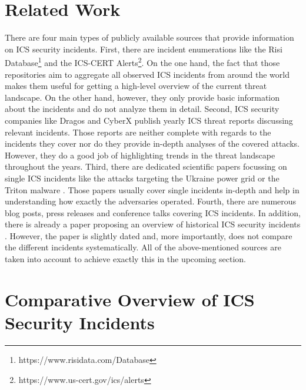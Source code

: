 \documentclass[runningheads]{llncs}
\begin{document}
\section{Related Work}
There are four main types of publicly available sources that provide information on ICS security incidents.
First, there are incident enumerations like the Risi Database\footnote{https://www.risidata.com/Database} and the ICS-CERT Alerts\footnote{https://www.us-cert.gov/ics/alerts}.
On the one hand, the fact that those repositories aim to aggregate all observed ICS incidents from around the world makes them useful for getting a high-level overview of the current threat landscape.
On the other hand, however, they only provide basic information about the incidents and do not analyze them in detail.
Second, ICS security companies like Dragos \cite{dragos.19} and CyberX \cite{cyberx.19} publish yearly ICS threat reports discussing relevant incidents.
Those reports are neither complete with regards to the incidents they cover nor do they provide in-depth analyses of the covered attacks.
However, they do a good job of highlighting trends in the threat landscape throughout the years.
Third, there are dedicated scientific papers focussing on single ICS incidents like the attacks targeting the Ukraine power grid \cite{eisac.16} or the Triton malware \cite{pinto.18}. Those papers usually cover single incidents in-depth and help in understanding how exactly the adversaries operated.
Fourth, there are numerous blog posts, press releases and conference talks covering ICS incidents.
In addition, there is already a paper proposing an overview of historical ICS security incidents \cite{hemsley.18}.
However, the paper is slightly dated and, more importantly, does not compare the different incidents systematically.
All of the above-mentioned sources are taken into account to achieve exactly this in the upcoming section.

\section{Comparative Overview of ICS Security Incidents}
\end{document}

